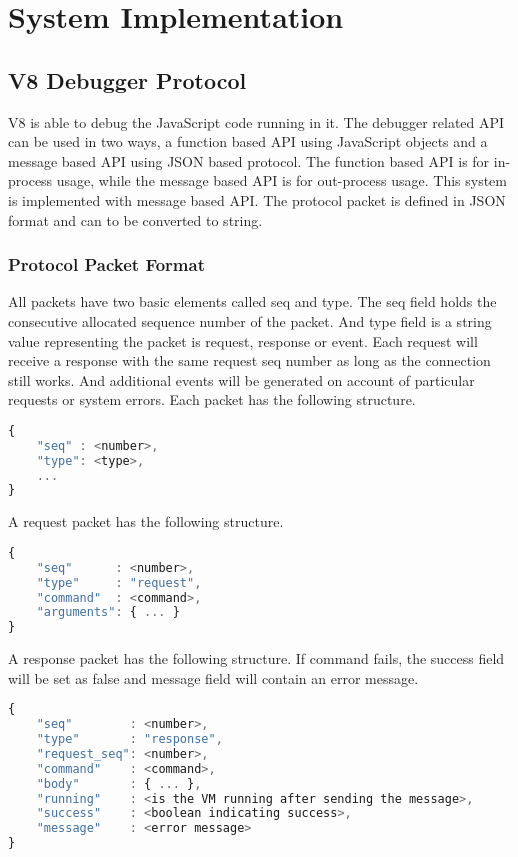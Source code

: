 \chapter {System Implementation}

\section {V8 Debugger Protocol}
V8 is able to debug the JavaScript code running in it. The debugger related API can be used in two ways, a function based API using JavaScript objects and a message based API using JSON based protocol. The function based API is for in-process usage, while the message based API is for out-process usage. This system is implemented with message based API. The protocol packet is defined in JSON format and can to be converted to string.

\subsection {Protocol Packet Format}
All packets have two basic elements called seq and type. The seq field holds the consecutive allocated sequence number of the packet. And type field is a string value representing the packet is request, response or event. Each request will receive a response with the same request seq number as long as the connection still works. And additional events will be generated on account of particular requests or system errors. Each packet has the following structure.

\begin{lstlisting}[language=JavaScript]
{
	"seq" : <number>,
	"type": <type>,
	...
}
\end{lstlisting}

A request packet has the following structure.
\begin{lstlisting}[language=JavaScript]
{
	"seq"      : <number>,
	"type"     : "request",
	"command"  : <command>,
	"arguments": { ... }
}
\end{lstlisting}

A response packet has the following structure. If command fails, the success field will be set as false and message field will contain an error message.
\begin{lstlisting}[language=JavaScript]
{
	"seq"        : <number>,
	"type"       : "response",
	"request_seq": <number>,
	"command"    : <command>,
	"body"       : { ... },
	"running"    : <is the VM running after sending the message>,
	"success"    : <boolean indicating success>,
	"message"    : <error message>
}
\end{lstlisting}


